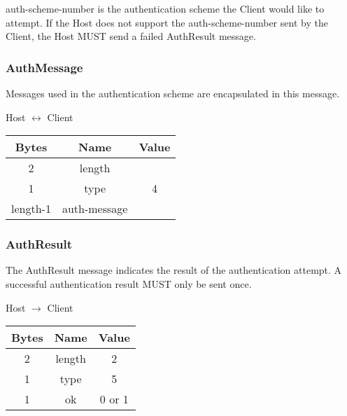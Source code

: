 auth-scheme-number is the authentication scheme the Client would like to attempt.
If the Host does not support the auth-scheme-number sent by the Client, the Host MUST send a failed AuthResult message.

\subsubsection{AuthMessage}

Messages used in the authentication scheme are encapsulated in this message.

\begin{center}
    Host $\leftrightarrow$ Client\\
    \begin{tabular}{|c|c|c|}
        \hline
        \textbf{Bytes} & \textbf{Name} & \textbf{Value} \\
        \hline
        2              & length        &                \\
        \hline
        1              & type          & 4              \\
        \hline
        length-1       & auth-message  &                \\
        \hline
    \end{tabular}
\end{center}

\subsubsection{AuthResult}

The AuthResult message indicates the result of the authentication attempt.
A successful authentication result MUST only be sent once.

\begin{center}
    Host $\rightarrow$ Client\\
    \begin{tabular}{|c|c|c|}
        \hline
        \textbf{Bytes} & \textbf{Name} & \textbf{Value} \\
        \hline
        2              & length        & 2              \\
        \hline
        1              & type          & 5              \\
        \hline
        1              & ok            & 0 or 1         \\
        \hline
    \end{tabular}
\end{center}

